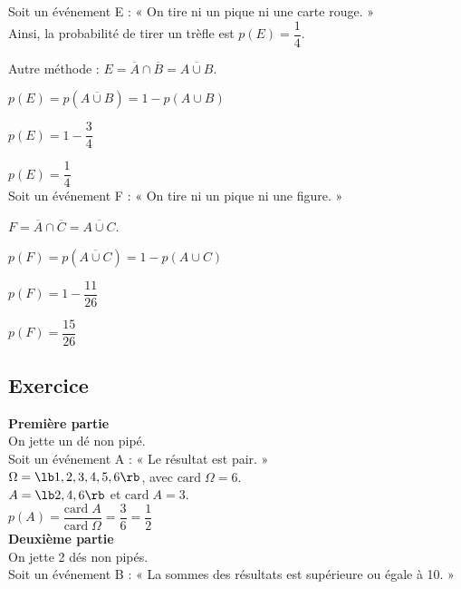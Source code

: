 Soit un événement E : « On tire ni un pique ni une carte rouge. » \\  Ainsi, la probabilité de tirer un trèfle est $p\left(E\right) = \dfrac{1}{4} $.

Autre méthode : $E = \overline{A} \cap \overline{B} = \overline{A \cup B}$. 

$p\left(E\right) = p\left(\overline{A\cup B}\right) = 1 - p\left(A \cup B\right) $

$p\left(E\right) = 1 - \dfrac{3}{4} $ 

$p\left(E\right) = \dfrac{1}{4} $ \\

Soit un événement F : « On tire ni un pique ni une figure. »

$F = \overline{A} \cap \overline{C} = \overline{A \cup C}$. 

$p\left(F\right) = p\left(\overline{A\cup C}\right) = 1 - p\left(A \cup C\right) $ 

$p\left(F\right) = 1 - \dfrac{11}{26} $ 

$p\left(F\right) = \dfrac{15}{26} $ 

\newpage

\subsection{Exercice }

\textbf{Première partie} \\

On jette un dé non pipé. \\ 

Soit un événement A : « Le résultat est pair. » \\

$\Omega = \lb 1,2,3,4,5,6 \rb $, avec $\mathrm{card} \; \Omega = 6$. \\

$ A = \lb 2,4,6 \rb $ et $ \mathrm{card} \; A = 3$. \\

$p\left(A\right) = \dfrac{\mathrm{card} \; A}{\mathrm{card} \; \Omega} = \dfrac{3}{6} = \dfrac{1}{2} $ \\

\textbf{Deuxième partie} \\

On jette 2 dés non pipés. \\ 

Soit un événement B : « La sommes des résultats est supérieure ou égale à 10. » \\


